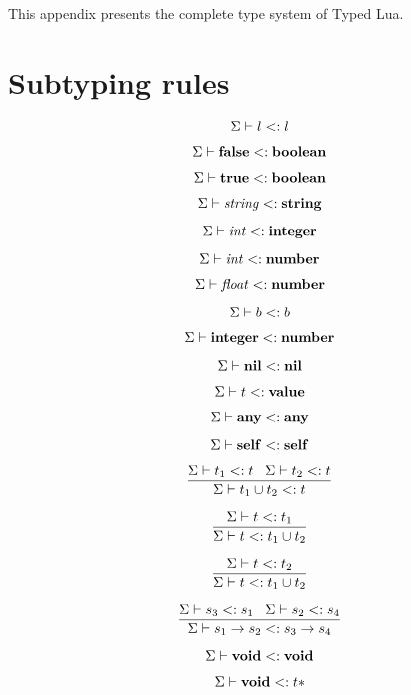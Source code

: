 This appendix presents the complete type system of Typed Lua.

\section{Subtyping rules}

\noindent

\[
\Sigma \vdash l <: l
\]

\[
\Sigma \vdash \mathbf{false} <: \mathbf{boolean}
\]

\[
\Sigma \vdash \mathbf{true} <: \mathbf{boolean}
\]

\[
\Sigma \vdash {\it string} <: \mathbf{string}
\]

\[
\Sigma \vdash {\it int} <: \mathbf{integer}
\]

\[
\Sigma \vdash {\it int} <: \mathbf{number}
\]

\[
\Sigma \vdash {\it float} <: \mathbf{number}
\]

\[
\Sigma \vdash b <: b
\]

\[
\Sigma \vdash \mathbf{integer} <: \mathbf{number}
\]

\[
\Sigma \vdash \mathbf{nil} <: \mathbf{nil}
\]

\[
\Sigma \vdash t <: \mathbf{value}
\]

\[
\Sigma \vdash \mathbf{any} <: \mathbf{any}
\]

\[
\Sigma \vdash \mathbf{self} <: \mathbf{self}
\]

\[
\dfrac{\Sigma \vdash t_{1} <: t \;\;\;
       \Sigma \vdash t_{2} <: t}
      {\Sigma \vdash t_{1} \cup t_{2} <: t}
\]

\[
\dfrac{\Sigma \vdash t <: t_{1}}
      {\Sigma \vdash t <: t_{1} \cup t_{2}}
\]

\[
\dfrac{\Sigma \vdash t <: t_{2}}
      {\Sigma \vdash t <: t_{1} \cup t_{2}}
\]

\[
\dfrac{\Sigma \vdash s_{3} <: s_{1} \;\;\;
       \Sigma \vdash s_{2} <: s_{4}}
      {\Sigma \vdash s_{1} \rightarrow s_{2} <: s_{3} \rightarrow s_{4}}
\]

\[
\Sigma \vdash \mathbf{void} <: \mathbf{void}
\]

\[
\Sigma \vdash \mathbf{void} <: t{*}
\]

